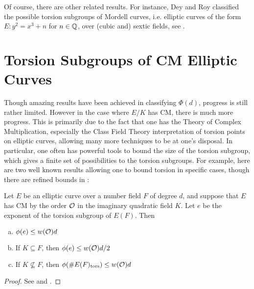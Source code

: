 Of course, there are other related results. For instance, Dey and Roy classified the possible torsion subgroups of Mordell curves, i.e. elliptic curves of the form $E: y^2= x^3 + n$ for $n \in \mathbb{Q}$, over (cubic and) sextic fields, see \cite{deyroy19}.





\section{Torsion Subgroups of CM Elliptic Curves}


Though amazing results have been achieved in classifying $\Phi(d)$, progress is still rather limited. However in the case where $E/K$ has CM, there is much more progress. This is primarily due to the fact that one has the Theory of Complex Multiplication, especially the Class Field Theory interpretation of torsion points on elliptic curves, allowing many more techniques to be at one's disposal. In particular, one often has powerful tools to bound the size of the torsion subgroup, which gives a finite set of possibilities to the torsion subgroups. For example, here are two well known results allowing one to bound torsion in specific cases, though there are refined bounds in \cite{clarkcookstankewicz13}:


\begin{thm}
Let $E$ be an elliptic curve over a number field $F$ of degree $d$, and suppose that $E$ has CM by the order $\mathcal{O}$ in the imaginary quadratic field $K$. Let $e$ be the exponent of the torsion subgroup of $E(F)$. Then
	\begin{enumerate}[(a)]
	\item $\phi(e) \leq w(\mathcal{O})d$
	\item If $K \subseteq F$, then $\phi(e) \leq w(\mathcal{O})d/2$
	\item If $K \not\subseteq F$, then $\phi(\#E(F)_{\text{tors}}) \leq w(\mathcal{O})d$
	\end{enumerate}
\end{thm}

\begin{proof}
See \cite{silverberg88} and \cite{prasadyogananda01}. 
\end{proof}


